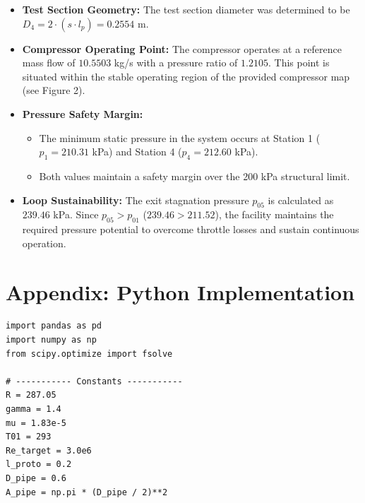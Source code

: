 \documentclass[12pt]{article}
\begin{document}
\begin{itemize}
    \item \textbf{Test Section Geometry:} The test section diameter was determined to be $D_4 = 2 \cdot (s \cdot l_p) = 0.2554$ m. 
    \item \textbf{Compressor Operating Point:} The compressor operates at a reference mass flow of $10.5503$ kg/s with a pressure ratio of $1.2105$. This point is situated within the stable operating region of the provided compressor map (see Figure 2).
    \item \textbf{Pressure Safety Margin:} 
    \begin{itemize}
        \item The minimum static pressure in the system occurs at Station 1 ($p_1 = 210.31$ kPa) and Station 4 ($p_4 = 212.60$ kPa).
        \item Both values maintain a safety margin over the 200 kPa structural limit.
    \end{itemize}
    \item \textbf{Loop Sustainability:} The exit stagnation pressure $p_{05}$ is calculated as $239.46$ kPa. Since $p_{05} > p_{01}$ ($239.46 > 211.52$), the facility maintains the required pressure potential to overcome throttle losses and sustain continuous operation.
\end{itemize}



\newpage
\newpage
\section*{Appendix: Python Implementation}
\begin{lstlisting}[caption={Constants and Input Parameters}]
import pandas as pd
import numpy as np
from scipy.optimize import fsolve

# ----------- Constants -----------
R = 287.05
gamma = 1.4
mu = 1.83e-5
T01 = 293
Re_target = 3.0e6
l_proto = 0.2
D_pipe = 0.6
A_pipe = np.pi * (D_pipe / 2)**2
\end{lstlisting}
\end{document}

